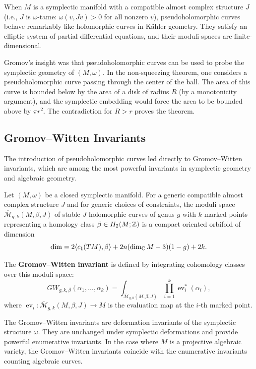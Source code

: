 When \(M\) is a symplectic manifold with a compatible almost complex structure \(J\) (i.e., \(J\) is \(\omega\)-tame: \(\omega(v, Jv) > 0\) for all nonzero \(v\)), pseudoholomorphic curves behave remarkably like holomorphic curves in K\"ahler geometry. They satisfy an elliptic system of partial differential equations, and their moduli spaces are finite-dimensional.

Gromov's insight was that pseudoholomorphic curves can be used to probe the symplectic geometry of \((M, \omega)\). In the non-squeezing theorem, one considers a pseudoholomorphic curve passing through the center of the ball. The area of this curve is bounded below by the area of a disk of radius \(R\) (by a monotonicity argument), and the symplectic embedding would force the area to be bounded above by \(\pi r^2\). The contradiction for \(R > r\) proves the theorem.

\subsection{Gromov--Witten Invariants}

The introduction of pseudoholomorphic curves led directly to Gromov--Witten invariants, which are among the most powerful invariants in symplectic geometry and algebraic geometry.

Let \((M, \omega)\) be a closed symplectic manifold. For a generic compatible almost complex structure \(J\) and for generic choices of constraints, the moduli space \(\overline{\mathcal{M}}_{g, k}(M, \beta, J)\) of stable \(J\)-holomorphic curves of genus \(g\) with \(k\) marked points representing a homology class \(\beta \in H_2(M; \mathbb{Z})\) is a compact oriented orbifold of dimension
\[
\dim = 2\langle c_1(TM), \beta\rangle + 2n(\dim_{\mathbb{C}} M - 3)(1-g) + 2k.
\]

The \textbf{Gromov--Witten invariant} is defined by integrating cohomology classes over this moduli space:
\[
GW_{g, k, \beta}(\alpha_1, \dots, \alpha_k) = \int_{\overline{\mathcal{M}}_{g, k}(M, \beta, J)} \prod_{i=1}^k \operatorname{ev}_i^*(\alpha_i),
\]
where \(\operatorname{ev}_i: \overline{\mathcal{M}}_{g, k}(M, \beta, J) \to M\) is the evaluation map at the \(i\)-th marked point.

\begin{theorem}
The Gromov--Witten invariants are deformation invariants of the symplectic structure \(\omega\). They are unchanged under symplectic deformations and provide powerful enumerative invariants. In the case where \(M\) is a projective algebraic variety, the Gromov--Witten invariants coincide with the enumerative invariants counting algebraic curves.
\end{theorem}


